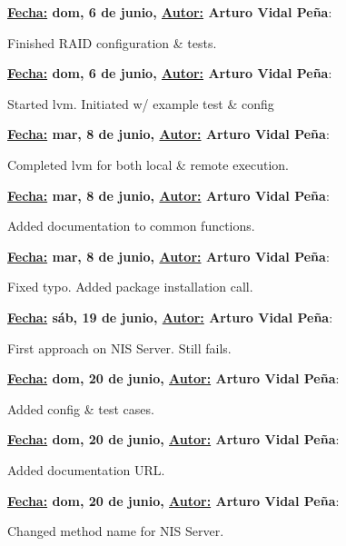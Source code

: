 \item \textbf{\underline{Fecha:} dom,  6 de junio, \underline{Autor:} Arturo Vidal Peña}:\\\item[] Finished RAID configuration \& tests.\\
\item \textbf{\underline{Fecha:} dom,  6 de junio, \underline{Autor:} Arturo Vidal Peña}:\\\item[] Started lvm. Initiated w/ example test \& config\\
\item \textbf{\underline{Fecha:} mar,  8 de junio, \underline{Autor:} Arturo Vidal Peña}:\\\item[] Completed lvm for both local \& remote execution.\\
\item \textbf{\underline{Fecha:} mar,  8 de junio, \underline{Autor:} Arturo Vidal Peña}:\\\item[] Added documentation to common functions.\\
\item \textbf{\underline{Fecha:} mar,  8 de junio, \underline{Autor:} Arturo Vidal Peña}:\\\item[] Fixed typo. Added package installation call.\\
\item \textbf{\underline{Fecha:} sáb, 19 de junio, \underline{Autor:} Arturo Vidal Peña}:\\\item[] First approach on NIS Server. Still fails.\\
\item \textbf{\underline{Fecha:} dom, 20 de junio, \underline{Autor:} Arturo Vidal Peña}:\\\item[] Added config \& test cases.\\
\item \textbf{\underline{Fecha:} dom, 20 de junio, \underline{Autor:} Arturo Vidal Peña}:\\\item[] Added documentation URL.\\
\item \textbf{\underline{Fecha:} dom, 20 de junio, \underline{Autor:} Arturo Vidal Peña}:\\\item[] Changed method name for NIS Server.\\
